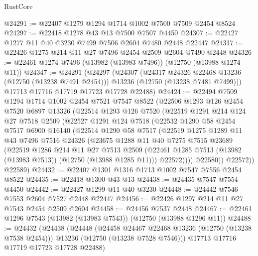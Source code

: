 \begin{lexlean}{RustCore}
\begin{coremodule}
@24291 := @22407 @1279 @1294 @1714 @1002 @7500 @7509 @2454 @8524
@24297 := @22418 @1278 @43 @13 @7500 @7507 @4450
@24307 := @22427 @1277 @11 @40 @3230 @7499 @7506 @2604 @7480 @2448 @22447
@24317 := @22426 @1275 @214 @11 @27 @7496 @2454 @2509 @2604 @7490 @2448
@24326 := @22461 @1274 @7496 (@13982 (@13983 @7496)) (@12750 (@13988 @1274 @11))
@24347 := @24291
    (@24297
      (@24307
        (@24317 @24326 @22468 @13236 (@12750 (@13238 @7491 @2454)))
        @13236
        (@12750 (@13238 @7481 @7499)))
      @17713
      @17716
      @17719
      @17723
      @17728
      @22488)
@24424 := @22494
    @7509
    @1294
    @1714
    @1002
    @2454
    @7521
    @7547
    @8522
    (@22506
      @1293
      @126
      @2454
      @7520
      @6897
      @13326
      (@22514
        @1293
        @126
        @7520
        (@22519
          @1291
          @214
          @124
          @27
          @7518
          @2509
          (@22527
            @1291
            @124
            @7518
            (@22532
              @1290
              @58
              @2454
              @7517
              @6900
              @16140
              (@22514
                @1290
                @58
                @7517
                (@22519
                  @1275
                  @1289
                  @11
                  @43
                  @7496
                  @7516
                  @24326
                  (@23675
                    @1288
                    @11
                    @40
                    @7275
                    @7515
                    @23689
                    (@22519
                      @1286
                      @214
                      @11
                      @27
                      @7513
                      @2509
                      (@22461 @1285 @7513 (@13982 (@13983 @7513)) (@12750 (@13988 @1285 @11)))
                      @22572))))
              @22580))
          @22572))
      @22589)
@24432 := @22407 @1301 @1316 @1713 @1002 @7547 @7556 @2454 @8522
@24435 := @22418 @1300 @43 @13
@24438 := @24435 @7547 @7554 @4450
@24442 := @22427 @1299 @11 @40 @3230
@24448 := @24442 @7546 @7553 @2604 @7527 @2448 @22447
@24456 := @22426 @1297 @214 @11 @27 @7543 @2454 @2509 @2604
@24458 := @24456 @7537 @2448
@24467 := @22461 @1296 @7543 (@13982 (@13983 @7543)) (@12750 (@13988 @1296 @11))
@24488 := @24432
    (@24438
      (@24448
        (@24458 @24467 @22468 @13236 (@12750 (@13238 @7538 @2454)))
        @13236
        (@12750 (@13238 @7528 @7546)))
      @17713
      @17716
      @17719
      @17723
      @17728
      @22488)

\end{coremodule}
\end{lexlean}
